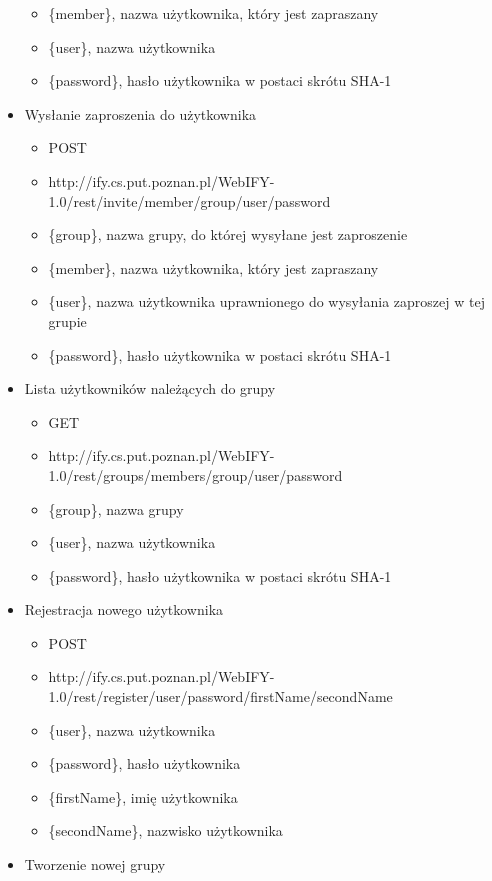 \documentclass[11pt,a4paper,polish,thesis]{dcsbook}
\begin{document}
\begin{itemize}
\begin{itemize}
		\item \{member\}, nazwa użytkownika, który jest zapraszany
		\item \{user\}, nazwa użytkownika
		\item \{password\},  hasło użytkownika w postaci skrótu SHA-1
	\end{itemize}
	\item Wysłanie zaproszenia do użytkownika
	\begin{itemize}
		\item POST
		\item http://ify.cs.put.poznan.pl/WebIFY-1.0/rest/invite/{member}/{group}/{user}/{password}
		\item \{group\}, nazwa grupy, do której wysyłane jest zaproszenie
		\item \{member\}, nazwa użytkownika, który jest zapraszany
		\item \{user\}, nazwa użytkownika uprawnionego do wysyłania zaproszej w tej grupie
		\item \{password\},  hasło użytkownika w postaci skrótu SHA-1
	\end{itemize}
	\item Lista użytkowników należących do grupy
	\begin{itemize}
		\item GET
		\item http://ify.cs.put.poznan.pl/WebIFY-1.0/rest/groups/members/{group}/{user}/{password}
		\item \{group\}, nazwa grupy
		\item \{user\}, nazwa użytkownika
		\item \{password\},  hasło użytkownika w postaci skrótu SHA-1
	\end{itemize}
	\item Rejestracja nowego użytkownika
	\begin{itemize}
		\item POST
		\item http://ify.cs.put.poznan.pl/WebIFY-1.0/rest/register/{user}/{password}/{firstName}/{secondName}
		\item \{user\}, nazwa użytkownika
		\item \{password\},  hasło użytkownika 
		\item \{firstName\}, imię użytkownika
		\item \{secondName\}, nazwisko użytkownika
	\end{itemize}
	\item Tworzenie nowej grupy
	\begin{itemize}

\end{itemize}
\end{itemize}
\end{document}
